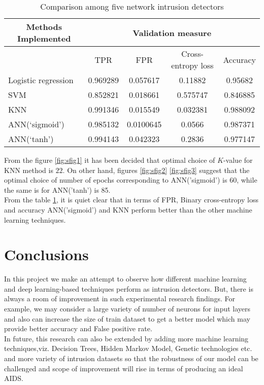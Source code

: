 \documentclass{llncs}
\begin{document}
\begin{table}[h]
\caption{Comparison among five network intrusion detectors } 
\centering %
\begin{tabular}{l | c | c | c | c }
\hline\hline
\multicolumn{1}{c}{Methods Implemented} & \multicolumn{4}{c}{Validation measure} 
\\ [0.5ex]
\hline
& TPR &  FPR  & Cross-entropy loss & Accuracy  \\[0.5ex]
\hline
Logistic regression &  0.969289 & 0.057617 & 0.11882 & 0.95682\\[0.05ex]
\hline
SVM &0.852821 & 0.018661 & 0.575747 & 0.846885\\[0.05ex]
\hline
KNN &0.991346 & 0.015549 & 0.032381 & 0.988092\\[0.05ex]
\hline
ANN(`sigmoid') & 0.985132 & 0.0100645 & 0.0566 & 0.987371\\[0.05ex]
\hline
ANN(`tanh')  & 0.994143 & 0.042323 & 0.2836 & 0.977147\\
\hline
\end{tabular}
\label{tab:PPer2}
\end{table}
From the figure \ref{fig:sfig1} it has been decided that optimal choice of $K$-value for KNN method is $22$. On other hand, figures \ref{fig:sfig2} \ref{fig:sfig3} suggest that the optimal choice of number of epochs corresponding to ANN('sigmoid') is 60, while the same is for ANN('tanh') is 85.\\
From the table \ref{tab:PPer2}, it is quiet clear that in terms of FPR, Binary cross-entropy loss and accuracy ANN('sigmoid') and KNN perform better than the other machine learning techniques.


\pagebreak

\section{Conclusions}
\vspace{-0.5cm}
In this project we make an attempt to observe how different machine learning and deep learning-based techniques perform as intrusion detectors. But, there is always a room of improvement in such experimental research findings. For example, we may consider a large variety of number of neurons for input layers and also can increase the size of train dataset to get a better model which may provide better accuracy and False positive rate.\\
In future, this research can also be extended by adding more machine learning techniques,viz. Decision Trees, Hidden Markov Model, Genetic technologies etc. and more variety of intrusion datasets so that the robustness of our model can be challenged and scope of improvement will rise in terms of producing an ideal AIDS.

\pagebreak



\end{document}
